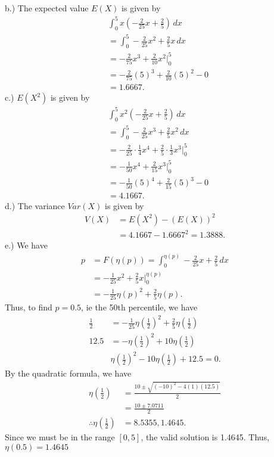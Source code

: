 \documentclass{report}
\begin{document}
 \bigbreak \noindent 
 b.) The expected value $E(X)$ is given by
 \begin{align*}
     &\int_{0}^{5} x\left(-\frac{2}{25}x + \frac{2}{5}\right) \, dx \\
     &=\int_{0}^{5} -\frac{2}{25}x^{2} + \frac{2}{5}x \, dx \\
     &=-\frac{2}{75}x^{3} + \frac{2}{10}x^{2} \bigg|^{5}_{0} \\
     &=-\frac{2}{75}(5)^{3} + \frac{2}{10}(5)^{2} - 0 \\
     &=1.6667
 .\end{align*}
 \bigbreak \noindent 
 c.) $E(X^{2})$ is given by
 \begin{align*}
     &\int_{0}^{5} x^{2}\left(-\frac{2}{25}x + \frac{2}{5}\right) \, dx \\
     &=\int_{0}^{5} -\frac{2}{25}x^{3} + \frac{2}{5}x^{2} \, dx \\
     &=-\frac{2}{25} \cdot \frac{1}{4} x^{4} + \frac{2}{5} \cdot \frac{1}{3} x^{3} \bigg|^{5}_{0} \\
     &=-\frac{1}{50}x^{4} + \frac{2}{15}x^{3} \bigg|^{5}_{0} \\
     &=-\frac{1}{50}(5)^{4} + \frac{2}{15}(5)^{3} - 0 \\
     &=4.1667
 .\end{align*}
 \bigbreak \noindent 
 d.) The variance $Var(X)$ is given by
 \begin{align*}
     V(X) &= E(X^{2}) - \left(E(X)\right)^{2} \\
     &=4.1667 - 1.6667^{2} = 1.3888
 .\end{align*}
 \bigbreak \noindent 
 e.) We have
 \begin{align*}
     p &= F(\eta(p)) = \int_{0}^{\eta(p)}  -\frac{2}{25}x + \frac{2}{5}\, dx \\
       &=-\frac{1}{25}x^{2} + \frac{2}{5}x \bigg|^{\eta(p)}_{0} \\
       &=-\frac{1}{25}\eta(p)^{2} + \frac{2}{5}\eta(p)
 .\end{align*}
 \bigbreak \noindent 
 Thus, to find $p=0.5$, ie the 50th percentile, we have
 \begin{align*}
     \frac{1}{2} &= -\frac{1}{25}\eta\left(\frac{1}{2}\right)^{2} + \frac{2}{5}\eta\left(\frac{1}{2}\right) \\
     12.5 &= -\eta\left(\frac{1}{2}\right)^{2} + 10 \eta\left(\frac{1}{2}\right) \\
          &\eta\left(\frac{1}{2}\right)^{2} - 10\eta\left(\frac{1}{2}\right) +12.5 = 0
 .\end{align*}
 \bigbreak \noindent 
 By the quadratic formula, we have
 \begin{align*}
     \eta\left(\frac{1}{2}\right) &= \frac{10 \pm \sqrt{(-10)^{2} - 4(1)(12.5)}}{2} \\
                                  &=\frac{10 \pm 7.0711}{2} \\
                                  \therefore \eta\left(\frac{1}{2}\right)&=8.5355,1.4645
 .\end{align*}
 \bigbreak \noindent 
 Since we must be in the range $[0,5]$, the valid solution is 1.4645. Thus, $\eta(0.5) = 1.4645$
\end{document}
